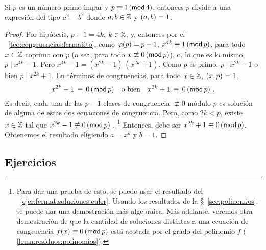 \begin{lemaFermat}[Reciprocidad]\label{lema:fermat:reciprocidad}
	Si $p$ es un n\'umero primo impar y $p\equiv 1\tmodulo[4]$,
	entonces $p$ divide a una expresi\'on del tipo $a^2+b^2$ donde
	$a,b\in\Enteros$ y $\mcd{a,b}=1$.
\end{lemaFermat}

\begin{proof}
	Por hip\'otesis, $p-1=4k$, $k\in\Enteros$, y, entonces por el
	\teoname~\ref{teo:congruencias:fermatito}, como $\eulerphi(p)=p-1$,
	$x^{4k}\equiv 1\tmodulo[p]$, para todo $x\in\Enteros$ coprimo con $p$
	(o sea, para todo $x\not\equiv 0\tmodulo[p]$), o, lo que es lo mismo,
	$p\mid x^{4k}-1$. Pero $x^{4k}-1=(x^{2k}-1)\,(x^{2k}+1)$. Como $p$ es
	primo, $p\mid x^{2k}-1$ o bien $p\mid x^{2k}+1$. En t\'erminos de
	congruencias, para todo $x\in\Enteros$, $\mcd{x,p}=1$,
	\begin{displaymath}
		x^{2k}-1\,\equiv\,0\tmodulo[p]
			\quad\text{o bien}\quad
			x^{2k}+1\,\equiv\,0\tmodulo[p]
			\text{ .}
	\end{displaymath}
	Es decir, cada una de las $p-1$ clases de congruencia $\not\equiv 0$
	m\'odulo $p$ es soluci\'on de alguna de estas dos ecuaciones de
	congruencia. Pero, como $2k<p$, existe $x\in\Enteros$ tal que
	$x^{2k}-1\not\equiv 0\tmodulo[p]$ \quedacomoejercicio.%
	\footnote{
		Para dar una prueba de esto, se puede usar el resultado del
		\ejername~\ref{ejer:fermat:soluciones:euler}.
		Usando los resultados de la \S~\ref{sec:polinomios}, se
		puede dar una demostraci\'on m\'as algebraica.
		M\'as adelante, veremos otra demostraci\'on de que la
		cantidad de soluciones distintas a una ecuaci\'on de
		congruencia $f(x)\equiv 0\tmodulo[p]$ est\'a acotada por
		el grado del polinomio $f$ (\lemaname~%
		\ref{lema:residuos:polinomios}).
	}
	Entonces, debe ser $x^{2k}+1\equiv 0\tmodulo[p]$.
	Obtenemos el resultado eligiendo $a=x^k$ y $b=1$.
\end{proof}

\subsection*{Ejercicios}


